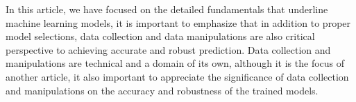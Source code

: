 
\par
In this article, we have focused on the detailed fundamentals that underline machine learning models, it is important to emphasize that in addition to proper model selections, data collection and data manipulations are also critical perspective to achieving accurate and robust prediction. Data collection and manipulations are technical and a domain of its own, although it is the focus of another article, it also important to appreciate the significance of data collection and manipulations on the accuracy and robustness of the trained models.
\par 
